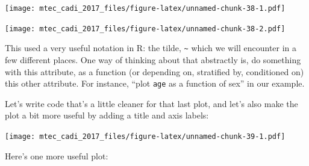 \documentclass[]{book}
\newenvironment{Shaded}{\begin{snugshade}}{\end{snugshade}}
\newcommand{\KeywordTok}[1]{\textcolor[rgb]{0.13,0.29,0.53}{\textbf{#1}}}
\newcommand{\DataTypeTok}[1]{\textcolor[rgb]{0.13,0.29,0.53}{#1}}
\newcommand{\StringTok}[1]{\textcolor[rgb]{0.31,0.60,0.02}{#1}}
\newcommand{\CommentTok}[1]{\textcolor[rgb]{0.56,0.35,0.01}{\textit{#1}}}
\newcommand{\OperatorTok}[1]{\textcolor[rgb]{0.81,0.36,0.00}{\textbf{#1}}}
\newcommand{\NormalTok}[1]{#1}
\theoremstyle{definition}
\theoremstyle{definition}
\theoremstyle{remark}
\begin{document}
\texttt{[image: mtec\_cadi\_2017\_files/figure-latex/unnamed-chunk-38-1.pdf]}

\begin{Shaded}
\end{Shaded}

\texttt{[image: mtec\_cadi\_2017\_files/figure-latex/unnamed-chunk-38-2.pdf]}

This used a very useful notation in R: the tilde,
\texttt{\textasciitilde{}} which we will encounter in a few different
places. One way of thinking about that abstractly is, do something with
this attribute, as a function (or depending on, stratified by,
conditioned on) this other attribute. For instance, ``plot \texttt{age}
as a function of sex'' in our example.

Let's write code that's a little cleaner for that last plot, and let's
also make the plot a bit more useful by adding a title and axis labels:

\begin{Shaded}
\end{Shaded}

\texttt{[image: mtec\_cadi\_2017\_files/figure-latex/unnamed-chunk-39-1.pdf]}

Here's one more useful plot:

\begin{Shaded}
\end{Shaded}
\end{document}

